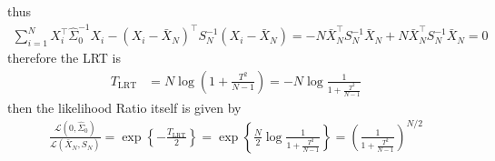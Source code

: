 \documentclass[10pt,notitlepage]{article}
\begin{document}
\begin{exercise}[Solution]
\begin{enumerate}[(a)]
                    thus
                    \begin{align*}
                        \sum_{i=1}^{N} X_i^\top\hat{\Sigma}_0^{-1}X_i - \left(X_i-\bar{X}_N\right)^\top S_N^{-1}\left(X_i-\bar{X}_N\right) = - N \bar{X}_N^\top S_N^{-1}\bar{X}_N + N \bar{X}_N^\top S_N^{-1}\bar{X}_N = 0
                    \end{align*}
                    therefore the LRT is 
                    \begin{align*}
                        T_{\text{LRT}} &= N\log\left(1+\frac{T^2}{N-1}\right) = -N\log\frac{1}{1+\frac{T^2}{N-1}}
                    \end{align*}
                    then the likelihood Ratio itself is given by
                    \begin{align*}
                        \frac{\mathcal{L}\left(0,\hat{\Sigma}_0\right)}{\mathcal{L}\left(\bar{X}_N,S_N\right)} = \exp\left\{-\frac{T_{\text{LRT}}}{2}\right\} = \exp\left\{\frac{N}{2}\log\frac{1}{1+\frac{T^2}{N-1}}\right\} = \left(\frac{1}{1+\frac{T^2}{N-1}}\right)^{N/2}
                    \end{align*}
        \end{enumerate}
    \end{exercise}
\end{document}
